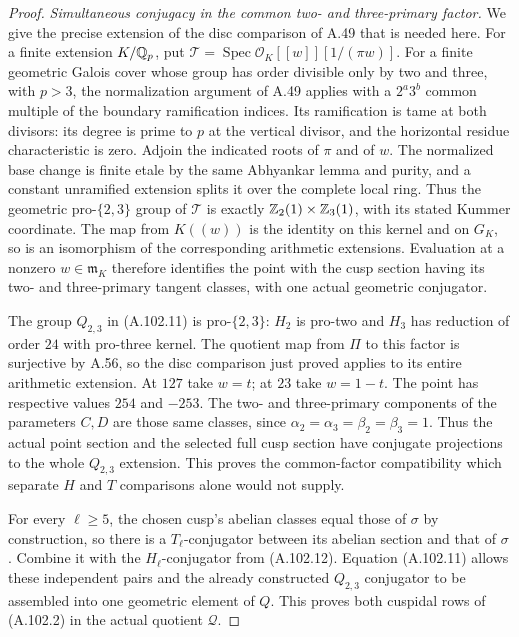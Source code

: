 \begin{proof}
\emph{Simultaneous conjugacy in the common two- and three-primary factor.}
We give the precise extension of the disc comparison
of A.49 that is needed here.
For a finite extension $K/\mathbb Q_p$, put
$\mathcal T=\operatorname{Spec}\mathcal O_K[[w]][1/(\pi w)]$.
For a finite geometric Galois cover whose group has
order divisible only by two and three, with $p>3$,
the normalization argument of A.49 applies with a
$2^a3^b$ common multiple of the boundary ramification
indices.  Its ramification is tame at both divisors:
its degree is prime to $p$ at the vertical divisor,
and the horizontal residue characteristic is zero.
Adjoin the indicated roots of $\pi$ and of $w$.
The normalized base change is finite etale by the
same Abhyankar lemma and purity, and a constant
unramified extension splits it over the complete
local ring.  Thus the geometric pro-$\{2,3\}$ group
of $\mathcal T$ is exactly
$\mathbb Z_2(1)\times\mathbb Z_3(1)$, with its stated Kummer
coordinate.  The map from $K((w))$ is the identity
on this kernel and on $G_K$, so is an isomorphism
of the corresponding arithmetic extensions.
Evaluation at a nonzero $w\in\mathfrak m_K$
therefore identifies the point with the cusp
section having its two- and three-primary tangent
classes, with one actual geometric conjugator.

The group $Q_{2,3}$ in (A.102.11) is pro-$\{2,3\}$:
$H_2$ is pro-two and $H_3$ has reduction of order
$24$ with pro-three kernel.
The quotient map from $\Pi$ to this factor is
surjective by A.56, so the disc comparison just
proved applies to its entire arithmetic extension.
At $127$ take $w=t$; at $23$ take $w=1-t$.
The point has respective values $254$ and $-253$.
The two- and three-primary components of the
parameters $C,D$ are those same classes, since
$\alpha_2=\alpha_3=\beta_2=\beta_3=1$.
Thus the actual point section and the selected
full cusp section have conjugate projections to
the whole $Q_{2,3}$ extension.
This proves the common-factor compatibility which
separate $H$ and $T$ comparisons alone would not supply.

For every $\ell\ge5$, the chosen cusp's abelian
classes equal those of $\sigma$ by construction,
so there is a $T_\ell$-conjugator between its
abelian section and that of $\sigma$.
Combine it with the $H_\ell$-conjugator from
(A.102.12).  Equation (A.102.11) allows these
independent pairs and the already constructed
$Q_{2,3}$ conjugator to be assembled into one
geometric element of $Q$.
This proves both cuspidal rows of (A.102.2)
in the actual quotient $\mathcal Q$.


\end{proof}
